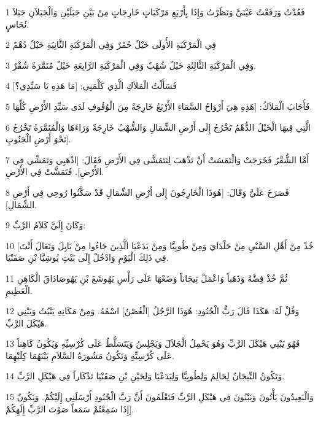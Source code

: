 \par 1 فَعُدْتُ وَرَفَعْتُ عَيْنَيَّ وَنَظَرْتُ وَإِذَا بِأَرْبَعِ مَرْكَبَاتٍ خَارِجَاتٍ مِنْ بَيْنِ جَبَلَيْنِ وَالْجَبَلاَنِ جَبَلاَ نُحَاسٍ.
\par 2 فِي الْمَرْكَبَةِ الأُولَى خَيْلٌ حُمْرٌ وَفِي الْمَرْكَبَةِ الثَّانِيَةِ خَيْلٌ دُهْمٌ
\par 3 وَفِي الْمَرْكَبَةِ الثَّالِثَةِ خَيْلٌ شُهْبٌ وَفِي الْمَرْكَبَةِ الرَّابِعَةِ خَيْلٌ مُنَمَّرَةٌ شُقْرٌ.
\par 4 فَسَأَلْتُ الْمَلاَكِ الَّذِي كَلَّمَنِي: [مَا هَذِهِ يَا سَيِّدِي؟]
\par 5 فَأَجَابَ الْمَلاَكُ: [هَذِهِ هِيَ أَرْوَاحُ السَّمَاءِ الأَرْبَعُ خَارِجَةٌ مِنَ الْوُقُوفِ لَدَى سَيِّدِ الأَرْضِ كُلِّهَا.
\par 6 الَّتِي فِيهَا الْخَيْلُ الدُّهْمُ تَخْرُجُ إِلَى أَرْضِ الشِّمَالِ وَالشُّهْبُ خَارِجَةٌ وَرَاءَهَا وَالْمُنَمَّرَةُ تَخْرُجُ نَحْوَ أَرْضِ الْجَنُوبِ].
\par 7 أَمَّا الشُّقْرُ فَخَرَجَتْ وَالْتَمَسَتْ أَنْ تَذْهَبَ لِتَتَمَشَّى فِي الأَرْضِ فَقَالَ: [اذْهَبِي وَتَمَشِّي فِي الأَرْضِ]. فَتَمَشَّتْ فِي الأَرْضِ.
\par 8 فَصَرَخَ عَلَيَّ وَقَالَ: [هُوَذَا الْخَارِجُونَ إِلَى أَرْضِ الشِّمَالِ قَدْ سَكَّنُوا رُوحِي فِي أَرْضِ الشِّمَالِ].
\par 9 وَكَانَ إِلَيَّ كَلاَمُ الرَّبِّ:
\par 10 [خُذْ مِنْ أَهْلِ السَّبْيِ مِنْ حَلْدَايَ وَمِنْ طُوبِيَّا وَمِنْ يَدَعْيَا الَّذِينَ جَاءُوا مِنْ بَابِلَ وَتَعَالَ أَنْتَ فِي ذَلِكَ الْيَوْمِ وَادْخُلْ إِلَى بَيْتِ يُوشِيَّا بْنِ صَفَنْيَا.
\par 11 ثُمَّ خُذْ فِضَّةً وَذَهَباً وَاعْمَلْ تِيجَاناً وَضَعْهَا عَلَى رَأْسِ يَهُوشَعَ بْنِ يَهُوصَادَاقَ الْكَاهِنِ الْعَظِيمِ.
\par 12 وَقُلْ لَهُ: هَكَذَا قَالَ رَبُّ الْجُنُودِ: هُوَذَا الرَّجُلُ [الْغُصْنُ] اسْمُهُ. وَمِنْ مَكَانِهِ يَنْبُتُ وَيَبْنِي هَيْكَلَ الرَّبِّ.
\par 13 فَهُوَ يَبْنِي هَيْكَلَ الرَّبِّ وَهُوَ يَحْمِلُ الْجَلاَلَ وَيَجْلِسُ وَيَتَسَلَّطُ عَلَى كُرْسِيِّهِ وَيَكُونُ كَاهِناً عَلَى كُرْسِيِّهِ وَتَكُونُ مَشُورَةُ السَّلاَمِ بَيْنَهُمَا كِلَيْهِمَا.
\par 14 وَتَكُونُ التِّيجَانُ لِحَالِمَ وَلِطُوبِيَّا وَلِيَدَعْيَا وَلِحَيْنِ بْنِ صَفَنْيَا تَذْكَاراً فِي هَيْكَلِ الرَّبِّ.
\par 15 وَالْبَعِيدُونَ يَأْتُونَ وَيَبْنُونَ فِي هَيْكَلِ الرَّبِّ فَتَعْلَمُونَ أَنَّ رَبَّ الْجُنُودِ أَرْسَلَنِي إِلَيْكُمْ. وَيَكُونُ إِذَا سَمِعْتُمْ سَمَعاً صَوْتَ الرَّبِّ إِلَهِكُمْ].

